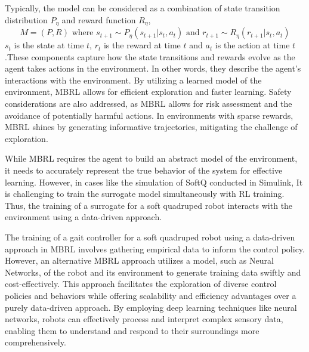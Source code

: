 Typically, the model can be considered as a combination of state transition distribution $P_\eta$ and reward function $R_\eta$, $$M = (P,R) \textrm{ where } s_{t+1}\sim P_\eta(s_{t+1}|s_t, a_t) \textrm{ and } r_{t+1}\sim R_\eta(r_{t+1}|s_t, a_t)$$ $s_t$ is the state at time $t$, $r_t$ is the reward at time $t$ and $a_t$ is the action at time $t$.These components capture how the state transitions and rewards evolve as the agent takes actions in the environment. In other words, they describe the agent's interactions with the environment. By utilizing a learned model of the environment, \ac{MBRL} allows for efficient exploration and faster learning. Safety considerations are also addressed, as MBRL allows for risk assessment and the avoidance of potentially harmful actions. In environments with sparse rewards, MBRL shines by generating informative trajectories, mitigating the challenge of exploration.

While MBRL requires the agent to build an abstract model of the environment, it needs to accurately represent the true behavior of the system for effective learning. However, in cases like the simulation of SoftQ conducted in Simulink, It is challenging to train the surrogate model simultaneously with RL training. Thus, the training of a surrogate for a soft quadruped robot interacts with the environment using a data-driven approach.

The training of a gait controller for a soft quadruped robot using a data-driven approach in \ac{MBRL} involves gathering empirical data to inform the control policy. However, an alternative MBRL approach utilizes a model, such as Neural Networks, of the robot and its environment to generate training data swiftly and cost-effectively.  This approach facilitates the exploration of diverse control policies and behaviors while offering scalability and efficiency advantages over a purely data-driven approach. By employing deep learning techniques like neural networks, robots can effectively process and interpret complex sensory data, enabling them to understand and respond to their surroundings more comprehensively.

